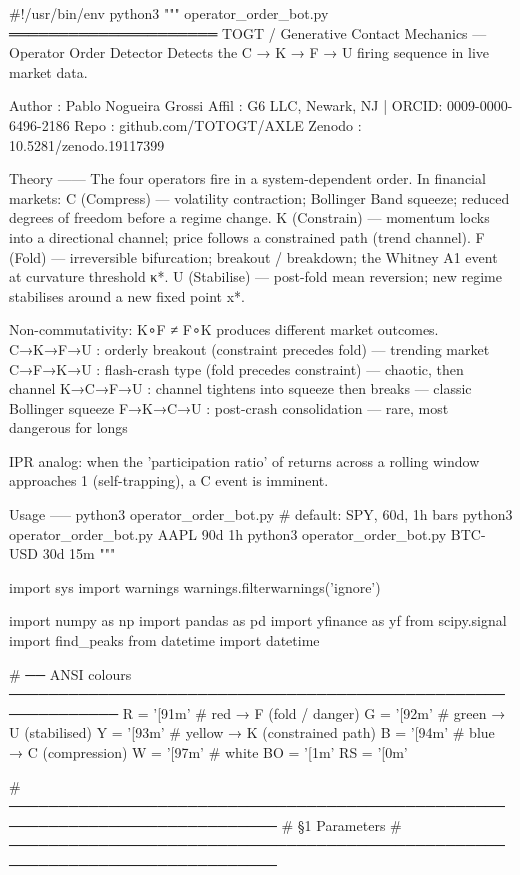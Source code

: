 #!/usr/bin/env python3
"""
operator_order_bot.py
═════════════════════
TOGT / Generative Contact Mechanics — Operator Order Detector
Detects the C → K → F → U firing sequence in live market data.

Author : Pablo Nogueira Grossi
Affil  : G6 LLC, Newark, NJ | ORCID: 0009-0000-6496-2186
Repo   : github.com/TOTOGT/AXLE
Zenodo : 10.5281/zenodo.19117399

Theory
------
The four operators fire in a system-dependent order. In financial markets:
  C  (Compress)   — volatility contraction; Bollinger Band squeeze;
                    reduced degrees of freedom before a regime change.
  K  (Constrain)  — momentum locks into a directional channel;
                    price follows a constrained path (trend channel).
  F  (Fold)       — irreversible bifurcation; breakout / breakdown;
                    the Whitney A1 event at curvature threshold κ*.
  U  (Stabilise)  — post-fold mean reversion; new regime stabilises
                    around a new fixed point x*.

Non-commutativity: K∘F ≠ F∘K produces different market outcomes.
  C→K→F→U : orderly breakout (constraint precedes fold) — trending market
  C→F→K→U : flash-crash type (fold precedes constraint) — chaotic, then channel
  K→C→F→U : channel tightens into squeeze then breaks — classic Bollinger squeeze
  F→K→C→U : post-crash consolidation — rare, most dangerous for longs

IPR analog: when the 'participation ratio' of returns across a rolling window
approaches 1 (self-trapping), a C event is imminent.

Usage
-----
  python3 operator_order_bot.py              # default: SPY, 60d, 1h bars
  python3 operator_order_bot.py AAPL 90d 1h
  python3 operator_order_bot.py BTC-USD 30d 15m
"""

import sys
import warnings
warnings.filterwarnings('ignore')

import numpy as np
import pandas as pd
import yfinance as yf
from scipy.signal import find_peaks
from datetime import datetime

# ── ANSI colours ─────────────────────────────────────────────────────────────
R  = '[91m'   # red    → F (fold / danger)
G  = '[92m'   # green  → U (stabilised)
Y  = '[93m'   # yellow → K (constrained path)
B  = '[94m'   # blue   → C (compression)
W  = '[97m'   # white
BO = '[1m'
RS = '[0m'

# ─────────────────────────────────────────────────────────────────────────────
# §1  Parameters
# ─────────────────────────────────────────────────────────────────────────────

